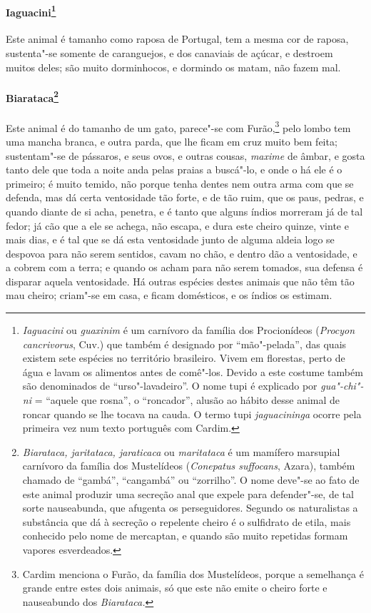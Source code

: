 \paragraph{Iaguacini\footnote{ \textit{Iaguacini} ou
\textit{guaxinim} é um carnívoro da família dos Procionídeos 
(\textit{Procyon cancrivorus}, Cuv.) que também é designado por
``mão"-pelada'', das quais existem sete espécies no território
brasileiro. Vivem em florestas, perto de água e lavam os alimentos
antes de comê"-los. Devido a este costume também são denominados de ``urso"-lavadeiro''. 
O nome tupi é explicado por \textit{gua"-chi"-ni} = ``aquele que rosna'', 
o ``roncador'', alusão ao hábito desse animal de
roncar quando se lhe tocava na cauda. O termo tupi \textit{jaguacininga}
ocorre pela primeira vez num texto português com Cardim.}} Este animal 
é tamanho como raposa de Portugal, tem a mesma cor de
raposa, sustenta"-se somente de caranguejos, e dos canaviais de açúcar,
e destroem muitos deles; são muito dorminhocos, e dormindo os matam,
não fazem mal. 

\paragraph{Biarataca\footnote{ \textit{Biarataca, jaritataca,
jaraticaca} ou \textit{maritataca} é um mamífero marsupial carnívoro
da família dos Mustelídeos (\textit{Conepatus suffocans}, Azara),
também chamado de ``gambá'', ``cangambá'' ou ``zorrilho''. O nome deve"-se ao
fato de este animal produzir uma secreção anal que expele para
defender"-se, de tal sorte nauseabunda, que afugenta os perseguidores.
Segundo os naturalistas a substância que dá à secreção o repelente
cheiro é o sulfidrato de etila, mais conhecido pelo nome de mercaptan,
e quando são muito repetidas formam vapores esverdeados.}} Este animal é 
do tamanho de um gato, parece"-se com Furão,\footnote{ Cardim menciona o 
Furão, da família dos Mustelídeos, porque a
semelhança é grande entre estes dois animais, só que este não emite o
cheiro forte e nauseabundo dos \textit{Biarataca.}} pelo lombo tem uma
mancha branca, e outra parda, que lhe ficam em cruz muito bem feita;
sustentam"-se de pássaros, e seus ovos, e outras cousas, \textit{maxime}
de âmbar, e gosta tanto dele que toda a noite anda pelas praias a
buscá"-lo, e onde o há ele é o primeiro; é muito temido, não
porque tenha dentes nem outra arma com que se defenda, mas dá certa
ventosidade tão forte, e de tão ruim, que os paus, pedras, e quando
diante de si acha, penetra, e é tanto que alguns índios morreram já de
tal fedor; já cão que a ele se achega, não escapa, e dura este cheiro
quinze, vinte e mais dias, e é tal que se dá esta ventosidade junto de
alguma aldeia logo se despovoa para não serem sentidos, cavam no chão,
e dentro dão a ventosidade, e a cobrem com a terra; e quando os acham
para não serem tomados, sua defensa é disparar aquela ventosidade.
 Há outras espécies destes animais que não têm tão mau cheiro; criam"-se
em casa, e ficam domésticos, e os índios os estimam.

